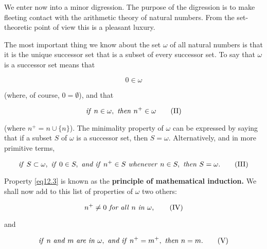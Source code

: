 We enter now into a minor digression. The purpose of the digression is to make fleeting contact with the arithmetic theory of natural numbers. From the set-theoretic point of view this is a pleasant luxury. 

The most important thing we know about the set $\omega$ of all natural numbers is that it is the unique successor set that is a subset of every successor set. To say that $\omega$ is a successor set means that

\begin{equation}
\label{eq12.1}
0 \in \omega \tag{I}
\end{equation}

(where, of course, $0 = \emptyset$), and that 

\begin{equation}
\label{eq12.2}
\text{\textit{if} } n \in\omega, \text{ \textit{then} } n^{+} \in \omega \tag{II}
\end{equation}

(where $n^{+} = n \cup \{ n \}$). The minimality property of $\omega$ can be expressed by saying that if a subset $S$ of $\omega$ is a successor set, then $S = \omega$. Alternatively, and in more primitive terms,

\begin{equation}
\label{eq12.3}
\text{\textit{if} } S \subset \omega, \text{ \textit{if} } 0 \in S, \text{ \textit{and if} } n^{+} \in S \text{ \textit{whenever} } n \in S, \text{ \textit{then} } S = \omega . \tag{III}
\end{equation}

Property \eqref{eq12.3} is known as the \textbf{principle of mathematical induction.} We shall now add to this list of properties of $\omega$ two others: 

\begin{equation}
\label{eq12.4}
n^{+} \neq 0 \text{ \textit{for all} } n \text{ \textit{in} } \omega , \tag{IV}
\end{equation}

and

\begin{equation}
\label{eq12.5}
\text{\textit{if} } n \text{ \textit{and} } m \text{ \textit{are in} } \omega , \text{ \textit{and if} } n^{+} = m^{+} , \text{ \textit{then} } n = m.\tag{V}
\end{equation}

